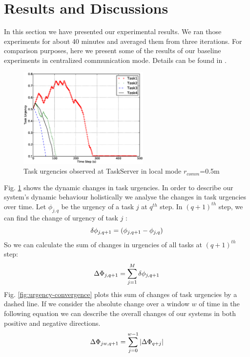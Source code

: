 \documentclass[letterpaper, 10 pt, conference]{ieeeconf}  %
\begin{document}
\section{Results and Discussions}
\label{sec:results}
In this section we have presented our experimental results. We ran those experiments for about 40 minutes and averaged them from three iterations. For comparison purposes, here we present some of the  results of our baseline experiments in centralized communication mode. Details can be found in \cite{Sarker}.\\
\begin{figure}
\centering
\includegraphics[height=5cm, angle=0]
{images/local-500cm/PlotUrgencyLog-2010Feb15-171017.eps}
\caption{\small Task urgencies observed at TaskServer in local mode $r_{comm}$=0.5m}
\label{fig:raw-urgencies} %
\end{figure}
Fig. \ref{fig:raw-urgencies} shows the dynamic changes in task urgencies.
In order to describe our system's dynamic behaviour holistically we analyse the changes in task urgencies over time. Let $ \phi_{j, q}$ be the urgency of a task $j$ at $q^{th}$ step. In $(q+1)^{th}$ step, we can find the change of urgency of task $j$ :\\
\begin{equation} 
\small
\delta \phi_{j, q+1} = ( \phi_{j, q+1} - \phi_{j, q}) 
\end{equation}
So we can calculate the sum of changes in urgencies of all tasks at $(q+1)^{th}$ step:
\begin{equation} 
\small
\Delta \Phi_{j, q+1} = \sum_{j=1}^{M} \delta \phi_{j, q+1} 
\label{eqn:Delta-Phi}
\end{equation}
Fig. \ref{fig:urgency-convergence} plots this sum of changes of task urgencies by a dashed line. If we consider the absolute change over a window $w$ of time in the following equation we can describe the overall changes of our systems in both positive and negative directions.
%
\begin{equation}
\small
\Delta \Phi_{jw, q+1} = \sum_{j=0}^{w-1} \left | \Delta \Phi_{q+j} \right |
\end{equation}
\end{document}
